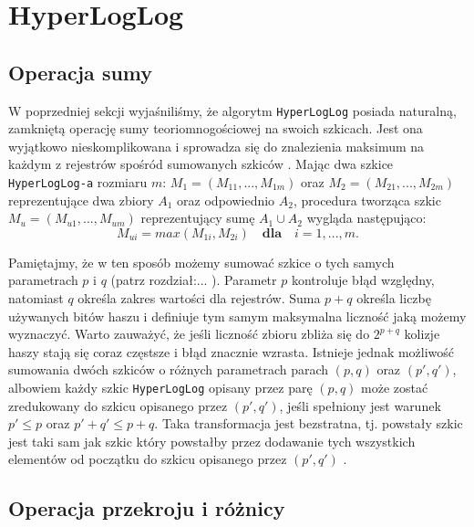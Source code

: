 \section{HyperLogLog}

\subsection{Operacja sumy}

W poprzedniej sekcji wyjaśniliśmy, że algorytm \texttt{HyperLogLog} posiada naturalną, zamkniętą operację sumy teoriomnogościowej na swoich szkicach. Jest ona wyjątkowo nieskomplikowana i sprowadza się do znalezienia maksimum na każdym z rejestrów spośród sumowanych szkiców \cite{oertl}. Mając dwa szkice \texttt{HyperLogLog-a} rozmiaru $m$: $M_1 = (M_{11}, ..., M_{1m})$ oraz $M_2 = (M_{21}, ..., M_{2m})$ reprezentujące dwa zbiory $A_1$ oraz odpowiednio $A_2$, procedura tworząca szkic $M_u = (M_{u1}, ..., M_{um})$ reprezentujący sumę $A_1 \cup A_2$ wygląda następująco:
\begin{equation}
    M_{ui} = max(M_{1i}, M_{2i}) \quad \textbf{dla} \quad i = 1,..., m.
\end{equation}

Pamiętajmy, że w ten sposób możemy sumować szkice o tych samych parametrach $p$ i $q$ (patrz rozdział:... ). Parametr $p$ kontroluje błąd względny, natomiast $q$ określa zakres wartości dla rejestrów. Suma $p + q$ określa liczbę używanych bitów haszu i definiuje tym samym maksymalna liczność jaką możemy wyznaczyć. Warto zauważyć, że jeśli liczność zbioru zbliża się do $2^{p+q}$ kolizje haszy stają się coraz częstsze i błąd znacznie wzrasta. Istnieje jednak możliwość sumowania dwóch szkiców o różnych parametrach parach $(p, q)$ oraz $(p',q')$, albowiem każdy szkic \texttt{HyperLogLog} opisany przez parę $(p, q)$ może zostać zredukowany do szkicu opisanego przez $(p', q')$, jeśli spełniony jest warunek $p' \leq p$ oraz $p' + q' \leq p + q$. Taka transformacja jest bezstratna, tj. powstały szkic jest taki sam jak szkic który powstałby przez dodawanie tych wszystkich elementów od początku do szkicu opisanego przez $(p', q')$ \cite{oertl}.

\subsection{Operacja przekroju i różnicy}

